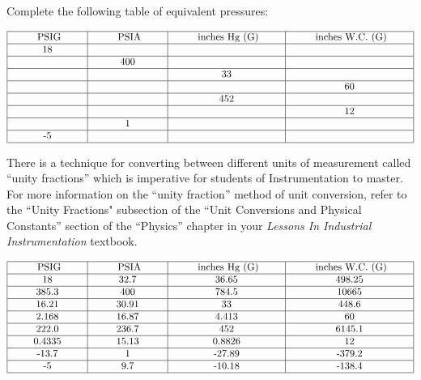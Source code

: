 

Complete the following table of equivalent pressures:


$$\vbox{\offinterlineskip
\halign{\strut
\vrule \quad\hfil # \ \hfil & 
\vrule \quad\hfil # \ \hfil & 
\vrule \quad\hfil # \ \hfil & 
\vrule \quad\hfil # \ \hfil \vrule \cr
\noalign{\hrule}
%
\hskip 20pt PSIG \hskip 20pt & \hskip 20pt PSIA \hskip 20pt & \hskip 20pt inches Hg (G) \hskip 20pt & \hskip 20pt inches W.C. (G) \hskip 20pt \cr
%
\noalign{\hrule}
%
18 &  &  &  \cr
%
\noalign{\hrule}
%
  & 400 &  &  \cr
%
\noalign{\hrule}
%
  &  & 33 &  \cr
%
\noalign{\hrule}
%
  &  &  & 60 \cr
%
\noalign{\hrule}
%
  &  & 452 &  \cr
%
\noalign{\hrule}
%
  &  &  & 12 \cr
%
\noalign{\hrule}
%
  & 1 &  &  \cr
%
\noalign{\hrule}
%
-5  &  &  &  \cr
%
\noalign{\hrule}
} %
}$$ %

\vskip 10pt

There is a technique for converting between different units of measurement called ``unity fractions'' which is imperative for students of Instrumentation to master.  For more information on the ``unity fraction'' method of unit conversion, refer to the ``Unity Fractions" subsection of the ``Unit Conversions and Physical Constants'' section of the ``Physics'' chapter in your {\it Lessons In Industrial Instrumentation} textbook.







$$\vbox{\offinterlineskip
\halign{\strut
\vrule \quad\hfil # \ \hfil & 
\vrule \quad\hfil # \ \hfil & 
\vrule \quad\hfil # \ \hfil & 
\vrule \quad\hfil # \ \hfil \vrule \cr
\noalign{\hrule}
%
\hskip 20pt PSIG \hskip 20pt & \hskip 20pt PSIA \hskip 20pt & \hskip 20pt inches Hg (G) \hskip 20pt & \hskip 20pt inches W.C. (G) \hskip 20pt \cr
%
\noalign{\hrule}
%
18 & 32.7 & 36.65 & 498.25 \cr
%
\noalign{\hrule}
%
385.3 & 400 & 784.5 & 10665 \cr
%
\noalign{\hrule}
%
16.21 & 30.91 & 33 & 448.6 \cr
%
\noalign{\hrule}
%
2.168 & 16.87 & 4.413 & 60 \cr
%
\noalign{\hrule}
%
222.0 & 236.7 & 452 & 6145.1 \cr
%
\noalign{\hrule}
%
0.4335 & 15.13 & 0.8826 & 12 \cr
%
\noalign{\hrule}
%
-13.7 & 1 & -27.89 & -379.2 \cr
%
\noalign{\hrule}
%
-5 & 9.7 & -10.18 & -138.4 \cr
%
\noalign{\hrule}
} %
}$$ %

